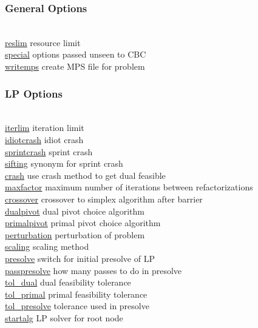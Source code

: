 
\subsubsection{General Options}
\begin{tabbing}
\hspace {1.3in} \= \\
\hyperlink{reslim}
{reslim} \> resource limit \\
\hyperlink{special}
{special} \> options passed unseen to CBC \\
\hyperlink{writemps}
{writemps} \> create MPS file for problem
\end{tabbing}

\subsubsection{LP Options}
\begin{tabbing}
\hspace {1.3in} \= \\
\hyperlink{iterlim}
{iterlim} \> iteration limit \\
\hyperlink{idiotcrash}
{idiotcrash} \> idiot crash \\
\hyperlink{sprintcrash}
{sprintcrash} \> sprint crash \\
\hyperlink{sifting}
{sifting} \> synonym for sprint crash \\
\hyperlink{crash}
{crash} \> use crash method to get dual feasible \\
\hyperlink{maxfactor}
{maxfactor} \> maximum number of iterations between refactorizations \\
\hyperlink{crossover}
{crossover} \> crossover to simplex algorithm after barrier \\
\hyperlink{dualpivot}
{dualpivot} \> dual pivot choice algorithm \\
\hyperlink{primalpivot}
{primalpivot} \> primal pivot choice algorithm \\
\hyperlink{perturbation}
{perturbation} \> perturbation of problem \\
\hyperlink{scaling}
{scaling} \> scaling method \\
\hyperlink{presolve}
{presolve} \> switch for initial presolve of LP \\
\hyperlink{passpresolve}
{passpresolve} \> how many passes to do in presolve \\
\hyperlink{tol_dual}
{tol\_dual} \> dual feasibility tolerance \\
\hyperlink{tol_primal}
{tol\_primal} \> primal feasibility tolerance \\
\hyperlink{tol_presolve}
{tol\_presolve} \> tolerance used in presolve \\
\hyperlink{startalg}
{startalg} \> LP solver for root node
\end{tabbing}


